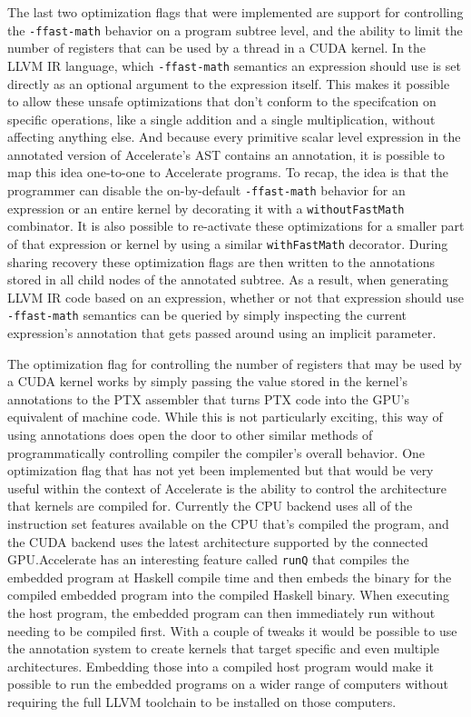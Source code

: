 \documentclass[fontsize=11pt,a4paper,parskip=half,numbers=noenddot]{scrartcl}
\newcommand{\hask}[1]{\texttt{#1}}
\begin{document}
The last two optimization flags that were implemented are support for
controlling the \texttt{-ffast-math} behavior on a program subtree level, and
the ability to limit the number of registers that can be used by a thread in a
CUDA kernel. In the LLVM IR language, which \texttt{-ffast-math} semantics an
expression should use is set directly as an optional argument to the expression
itself. This makes it possible to allow these unsafe optimizations that don't
conform to the specifcation on specific operations, like a single addition and a
single multiplication, without affecting anything else. And because every
primitive scalar level expression in the annotated version of Accelerate's AST
contains an annotation, it is possible to map this idea one-to-one to Accelerate
programs. To recap, the idea is that the programmer can disable the
on-by-default \texttt{-ffast-math} behavior for an expression or an entire
kernel by decorating it with a \hask{withoutFastMath} combinator. It is also
possible to re-activate these optimizations for a smaller part of that
expression or kernel by using a similar \hask{withFastMath} decorator. During
sharing recovery these optimization flags are then written to the annotations
stored in all child nodes of the annotated subtree. As a result, when generating
LLVM IR code based on an expression, whether or not that expression should use
\texttt{-ffast-math} semantics can be queried by simply inspecting the current
expression's annotation that gets passed around using an implicit parameter.

The optimization flag for controlling the number of registers that may be used
by a CUDA kernel works by simply passing the value stored in the kernel's
annotations to the PTX assembler that turns PTX code into the GPU's equivalent
of machine code. While this is not particularly exciting, this way of using
annotations does open the door to other similar methods of programmatically
controlling compiler the compiler's overall behavior. One optimization flag that
has not yet been implemented but that would be very useful within the context of
Accelerate is the ability to control the architecture that kernels are compiled
for. Currently the CPU backend uses all of the instruction set features
available on the CPU that's compiled the program, and the CUDA backend uses the
latest architecture supported by the connected GPU.\@ Accelerate has an
interesting feature called \hask{runQ} that compiles the embedded program at
Haskell compile time and then embeds the binary for the compiled embedded
program into the compiled Haskell binary. When executing the host program, the
embedded program can then immediately run without needing to be compiled first.
With a couple of tweaks it would be possible to use the annotation system to
create kernels that target specific and even multiple architectures. Embedding
those into a compiled host program would make it possible to run the embedded
programs on a wider range of computers without requiring the full LLVM toolchain
to be installed on those computers.
\end{document}
